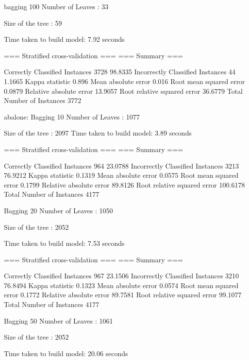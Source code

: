 bagging 100
Number of Leaves  : 	33

Size of the tree : 	59




Time taken to build model: 7.92 seconds

=== Stratified cross-validation ===
=== Summary ===

Correctly Classified Instances        3728               98.8335 %
Incorrectly Classified Instances        44                1.1665 %
Kappa statistic                          0.896 
Mean absolute error                      0.016 
Root mean squared error                  0.0879
Relative absolute error                 13.9057 %
Root relative squared error             36.6779 %
Total Number of Instances             3772     


abalone:
Bagging 10
Number of Leaves  : 	1077

Size of the tree : 	2097
Time taken to build model: 3.89 seconds

=== Stratified cross-validation ===
=== Summary ===

Correctly Classified Instances         964               23.0788 %
Incorrectly Classified Instances      3213               76.9212 %
Kappa statistic                          0.1319
Mean absolute error                      0.0575
Root mean squared error                  0.1799
Relative absolute error                 89.8126 %
Root relative squared error            100.6178 %
Total Number of Instances             4177     

Bagging 20
Number of Leaves  : 	1050

Size of the tree : 	2052

Time taken to build model: 7.53 seconds

=== Stratified cross-validation ===
=== Summary ===

Correctly Classified Instances         967               23.1506 %
Incorrectly Classified Instances      3210               76.8494 %
Kappa statistic                          0.1323
Mean absolute error                      0.0574
Root mean squared error                  0.1772
Relative absolute error                 89.7581 %
Root relative squared error             99.1077 %
Total Number of Instances             4177

Bagging 50
Number of Leaves  : 	1061

Size of the tree : 	2052




Time taken to build model: 20.06 seconds

